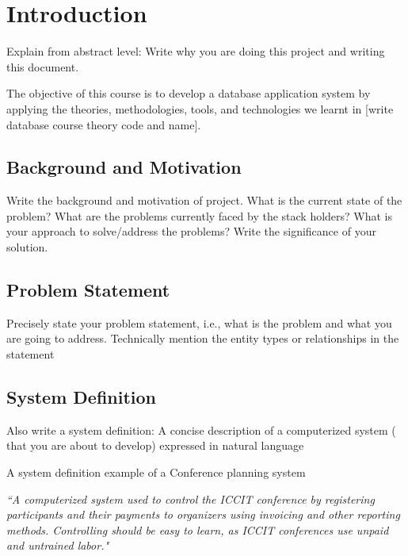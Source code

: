 
\section{Introduction}\label{sec:introduction}
Explain from abstract level:
Write why you are doing this project and writing this document. 

The objective of this course is to develop a database application system by applying the theories, methodologies, tools, and technologies we learnt in [write database course theory code and name].  


\subsection{Background and Motivation}\label{subsec:bm}
Write the background and motivation of project. What is the current state of the problem? What are the problems currently faced by the stack holders? What is your approach to solve/address the problems? Write the significance of your solution.   

\subsection{Problem Statement}\label{subsec:ps} Precisely state your problem statement, i.e., what is the problem and what you are going to address. Technically mention the entity types or relationships in the statement

\subsection{System Definition}\label{subsec:sd} 
Also write a system definition: A concise description of a computerized system ( that you are about to develop) expressed in natural language

A system definition example of a Conference planning system

\textit{``A computerized system used to control the ICCIT conference by registering participants and their payments to organizers using invoicing and other reporting methods. Controlling should be easy to learn, as ICCIT conferences use unpaid and untrained labor."}


